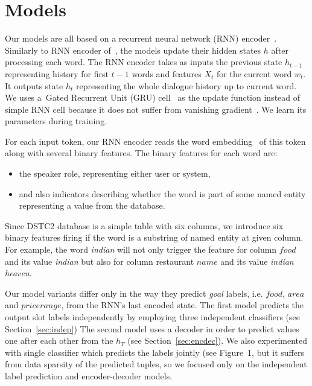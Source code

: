\documentclass{itatnew}
\begin{document}
\section{Models}
\label{sec:model}

Our models are all based on a recurrent neural network (RNN) encoder~\cite{werbos1990backpropagation}. Similarly to RNN encoder of~\cite{zilka2015incremental}, the models update their hidden states $h$ after processing each word. The RNN encoder takes as inputs the previous state $h_{t-1}$ representing history for first $t-1$ words and features $X_t$ for the current word $w_t$. It outputs state $h_t$ representing the whole dialogue history up to current word.
We uses a~Gated Recurrent Unit (GRU) cell~\cite{cho2014gru} as the update function instead of simple RNN cell because it does not suffer from vanishing gradient~\cite{TODO_vanishing_gradient}. We learn its parameters during training.

For each input token, our RNN encoder reads the word embedding~\cite{bengio2003neural} of this token along with several binary features. 
The binary features for each word are:
\begin{itemize}
	\item the speaker role, representing either user or system,
    \item and also indicators describing whether the word is part of some named entity representing a value from the database.
\end{itemize}
  
Since DSTC2 database is a simple table with six columns, we introduce six binary features firing if the word is a substring of named entity at given column.
For example, the word {\it indian} will not only trigger the feature for column $food$ and its value {\it indian} but also for column restaurant $name$ and its value {\it indian heaven}.

Our model variants differ only in the way they predict {\it goal} labels, i.e. $food$, $area$ and $price range$, from the RNN's last encoded state.
The first model predicts the output slot labels independently by employing three independent classifiers (see Section~\ref{sec:indep})
The second model uses a decoder in order to predict values one after each other from the $h_{T}$ (see Section~\ref{sec:encdec}).
We also experimented with single classifier which predicts the labels jointly (see Figure~1, but it suffers from data sparsity of the predicted tuples, so we focused only on the independent label prediction and encoder-decoder models.
\end{document}

